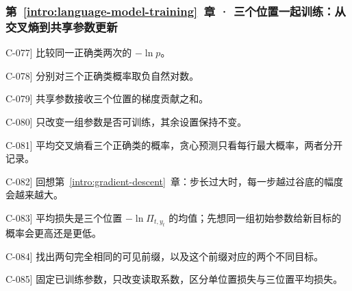 \subsubsection*{第~\ref*{intro:language-model-training}~章 · 三个位置一起训练：从交叉熵到共享参数更新}
\begin{answerhints}
\item[\hyperref[exercise:correct-probability-loss]{C-077}] \leavevmode{}\label{hint:correct-probability-loss}比较同一正确类两次的 $-\ln p$。
\item[\hyperref[exercise:joint-loss-average]{C-078}] \leavevmode{}\label{hint:joint-loss-average}分别对三个正确类概率取负自然对数。
\item[\hyperref[exercise:shared-parameter-gradient-sum]{C-079}] \leavevmode{}\label{hint:shared-parameter-gradient-sum}共享参数接收三个位置的梯度贡献之和。
\item[\hyperref[exercise:attention-attribution]{C-080}] \leavevmode{}\label{hint:attention-attribution}只改变一组参数是否可训练，其余设置保持不变。
\item[\hyperref[exercise:frozen-output-head-training]{C-081}] \leavevmode{}\label{hint:frozen-output-head-training}平均交叉熵看三个正确类的概率，贪心预测只看每行最大概率，两者分开记录。
\item[\hyperref[exercise:training-rate-transfer]{C-082}] \leavevmode{}\label{hint:training-rate-transfer}回想第~\ref*{intro:gradient-descent}~章：步长过大时，每一步越过谷底的幅度会越来越大。
\item[\hyperref[exercise:training-sentence-change]{C-083}] \leavevmode{}\label{hint:training-sentence-change}平均损失是三个位置 $-\ln\Pi_{t,y_t}$ 的均值；先想同一组初始参数给新目标的概率会更高还是更低。
\item[\hyperref[exercise:joint-prefix-loss-floor]{C-084}] \leavevmode{}\label{hint:joint-prefix-loss-floor}找出两句完全相同的可见前缀，以及这个前缀对应的两个不同目标。
\item[\hyperref[exercise:attention-causal-intervention]{C-085}] \leavevmode{}\label{hint:attention-causal-intervention}固定已训练参数，只改变读取系数，区分单位置损失与三位置平均损失。
\end{answerhints}
